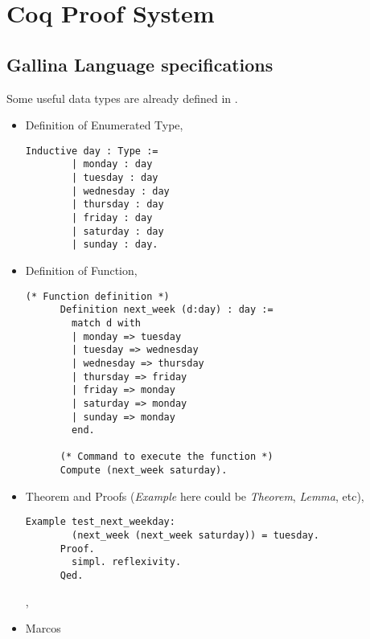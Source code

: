 \section{Coq Proof System}

\subsection{Gallina Language specifications}

Some useful data types are already defined in .

\begin{itemize}
  \renewcommand{\labelitemi}{$\dagger$}
  \item Definition of Enumerated Type,
    \begin{lstlisting}[language=coq]
      Inductive day : Type :=
        | monday : day
        | tuesday : day
        | wednesday : day
        | thursday : day
        | friday : day
        | saturday : day
        | sunday : day.
    \end{lstlisting}
  \item Definition of Function,
    \begin{lstlisting}[language=coq]
      (* Function definition *)
      Definition next_week (d:day) : day :=
        match d with
        | monday => tuesday
        | tuesday => wednesday
        | wednesday => thursday
        | thursday => friday
        | friday => monday
        | saturday => monday
        | sunday => monday
        end.
      
      (* Command to execute the function *)
      Compute (next_week saturday).
    \end{lstlisting}
  \item Theorem and Proofs (\emph{Example} here could be \emph{Theorem}, \emph{Lemma}, etc),
    \begin{lstlisting}[language=coq]
      Example test_next_weekday:
        (next_week (next_week saturday)) = tuesday.
      Proof. 
        simpl. reflexivity. 
      Qed.
    \end{lstlisting},
  \item Marcos
\end{itemize}
